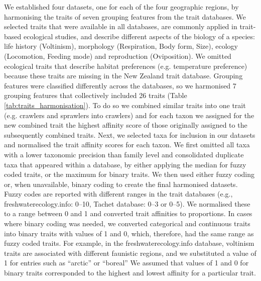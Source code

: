 \documentclass[12pt]{article}
\begin{document}
We established four datasets, one for each of the four geographic regions, by harmonising the traits of seven grouping features from the trait databases. We selected traits that were available in all databases, are commonly applied in trait-based ecological studies, and describe different aspects of the biology of a species: life history (Voltinism), morphology (Respiration, Body form, Size), ecology (Locomotion, Feeding mode) and reproduction (Oviposition). We omitted ecological traits that describe habitat preferences (e.g. temperature preference) because these traits are missing in the New Zealand trait database. Grouping features were classified differently across the databases, so we harmonised 7 grouping features that collectively included 26 traits (Table \ref{tab:traits_harmonisation}). To do so we combined similar traits into one trait (e.g. crawlers and sprawlers into crawlers) and for each taxon we assigned for the new combined trait the highest affinity score of those originally assigned to the subsequently combined traits. 
Next, we selected taxa for inclusion in our datasets and normalised the trait affinity scores for each taxon. We first omitted all taxa with a lower taxonomic precision than family level and consolidated duplicate taxa that appeared within a database, by either applying the median for fuzzy coded traits, or the maximum for binary traits. We then used either fuzzy coding or, when unavailable, binary coding to create the final harmonised datasets. Fuzzy codes are reported with different ranges in the trait databases (e.g., freshwaterecology.info: 0–10, Tachet database: 0–3 or 0–5). We normalised these to a range between 0 and 1 and converted trait affinities to proportions. In cases where binary coding was needed, we converted categorical and continuous traits into binary traits with values of 1 and 0, which, therefore, had the same range as fuzzy coded traits. For example, in the  freshwaterecology.info database, voltinism traits are associated with different faunistic regions, and we substituted a value of 1 for entries such as “arctic” or “boreal” %
We assumed that values of 1 and 0 for binary traits corresponded to the highest and lowest affinity for a particular trait.

\newpage
\end{document}
